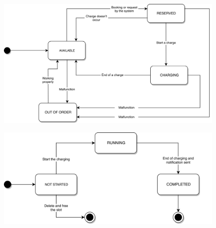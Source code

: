 \begin{figure}[H]
      \centering
      \includegraphics[scale=0.2]{src/state_diagram/cp.png}
\end{figure} \vspace{1cm}
\begin{figure}[H]
      \centering
      \includegraphics[scale=0.2]{src/state_diagram/transaction.png}
\end{figure} \vspace{1cm}

